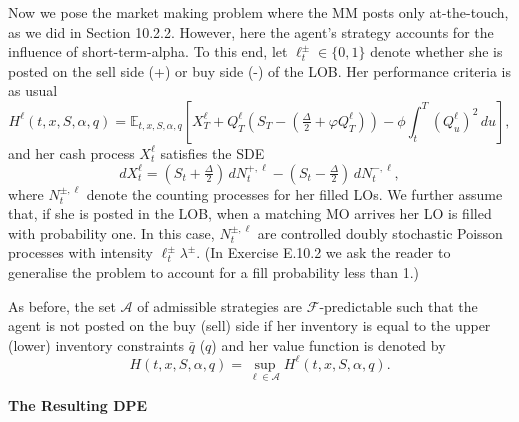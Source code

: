 \documentclass[11pt, a4paper]{book}
\newcommand{\E}{\mathbb{E}}
\begin{document}
	Now we pose the market making problem where the MM posts only at-the-touch, as we did in Section 10.2.2. However, here the agent's strategy accounts for the influence of short-term-alpha. To this end, let $\ell^\pm_t \in \{0, 1\}$ denote whether she is posted on the sell side (+) or buy side (-) of the LOB. Her performance criteria is as usual
	\[
	H^\ell(t, x, S, \alpha, q) = \E_{t,x,S,\alpha,q} \left[ X^\ell_T + Q^\ell_T \left( S_T - (\tfrac{\Delta}{2} + \varphi Q^\ell_T) \right) - \phi \int_t^T (Q^\ell_u)^2 \, du \right],
	\]
	and her cash process $X^\ell_t$ satisfies the SDE
	\[
	dX^\ell_t = (S_t + \tfrac{\Delta}{2}) \, dN^{+, \ell}_t - (S_t - \tfrac{\Delta}{2}) \, dN^{-, \ell}_t,
	\]
	where $N^{\pm, \ell}_t$ denote the counting processes for her filled LOs. We further assume that, if she is posted in the LOB, when a matching MO arrives her LO is filled with probability one. In this case, $N^{\pm, \ell}_t$ are controlled doubly stochastic Poisson processes with intensity $\ell^\pm_t \lambda^\pm$. (In Exercise E.10.2 we ask the reader to generalise the problem to account for a fill probability less than 1.)
	
	As before, the set $\mathcal{A}$ of admissible strategies are $\mathcal{F}$-predictable such that the agent is not posted on the buy (sell) side if her inventory is equal to the upper (lower) inventory constraints $\bar{q}$ ($q$) and her value function is denoted by
	\[
	H(t, x, S, \alpha, q) = \sup_{\ell \in \mathcal{A}} H^\ell(t, x, S, \alpha, q).
	\]
	
	\textbf{The Resulting DPE}
	
\end{document}
